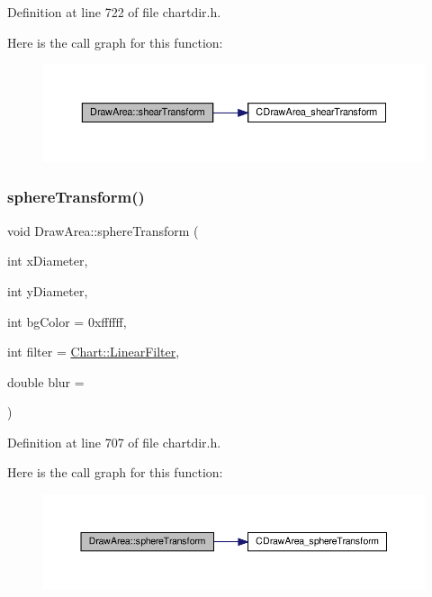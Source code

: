 Definition at line 722 of file chartdir.\+h.

Here is the call graph for this function\+:
\nopagebreak
\begin{figure}[H]
\begin{center}
\leavevmode
\includegraphics[width=350pt]{class_draw_area_a547ec9c5a3dae897a4dce221132bbd09_cgraph}
\end{center}
\end{figure}
\mbox{\label{class_draw_area_ad29f4a2dca884baba7db6bed362f564e}} 
\subsubsection{\texorpdfstring{sphere\+Transform()}{sphereTransform()}}
{\footnotesize\ttfamily void Draw\+Area\+::sphere\+Transform (\begin{DoxyParamCaption}\item[{int}]{x\+Diameter,  }\item[{int}]{y\+Diameter,  }\item[{int}]{bg\+Color = {\ttfamily 0xffffff},  }\item[{int}]{filter = {\ttfamily \hyperlink{namespace_chart_ab75b9aa1781d0e0159ef1d441b577764a8cd729b7a982bac2dce8b021511e3ac6}{Chart\+::\+Linear\+Filter}},  }\item[{double}]{blur = {} }\end{DoxyParamCaption})\hspace{0.3cm}{\ttfamily [inline]}}



Definition at line 707 of file chartdir.\+h.

Here is the call graph for this function\+:
\nopagebreak
\begin{figure}[H]
\begin{center}
\leavevmode
\includegraphics[width=350pt]{class_draw_area_ad29f4a2dca884baba7db6bed362f564e_cgraph}
\end{center}
\end{figure}
\mbox{\label{class_draw_area_a459880cd624ba786e7d0bee6f6f080d0}} 
